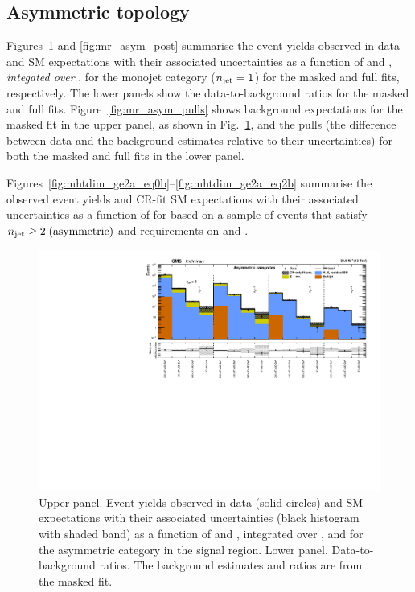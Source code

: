 \clearpage
\subsection{Asymmetric topology}
\label{app:results-orig-asym}

Figures~\ref{fig:mr_asym_pre} and \ref{fig:mr_asym_post} summarise the
event yields observed in data and SM expectations with their
associated uncertainties as a function of \scalht and \nb, {\it
  integated over \mht}, for the monojet category ($n_{\text{jet}} = 1$) for the
masked and full fits, respectively. The lower panels show the
data-to-background ratios for the masked and full fits.
Figure~\ref{fig:mr_asym_pulls} shows background expectations for the
masked fit in the upper panel, as shown in Fig.~\ref{fig:mr_asym_pre},
and the pulls (\ie the difference between data and the background
estimates relative to their uncertainties) for both the masked and
full fits in the lower panel.

Figures~\ref{fig:mhtdim_ge2a_eq0b}--\ref{fig:mhtdim_ge2a_eq2b}
summarise the observed event yields and CR-fit SM expectations with
their associated uncertainties as a function of \HTmiss for based on a
sample of events that satisfy $n_{\text{jet}} \geq 2 \; \textrm{(asymmetric)}$
and requirements on \nb and \scalht.

\clearpage
\begin{figure}[h!]
  \centering
  \caption{Upper panel. Event yields observed in data (solid circles)
    and SM expectations with their associated uncertainties (black
    histogram with shaded band) as a function of \nb and \scalht,
    integrated over \mht, and for the asymmetric \njet category
    in the signal region. Lower panel. Data-to-background ratios. The
    background estimates and ratios are from the masked fit. }
  \label{fig:mr_asym_pre}
  \includegraphics[width=1.\linewidth]{figures/results/36invfb_preapproval/asym/summaryPlot_Asymmetric_prefit}
\end{figure}

